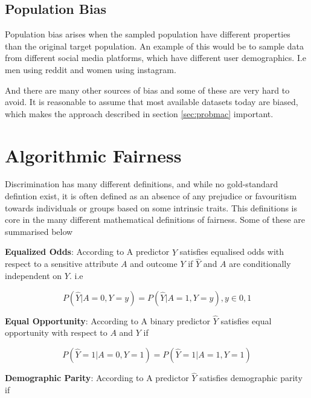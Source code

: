 \subsection{Population Bias}

Population bias arises when the sampled population have different properties than the original target population. \cite{Olteanu:2019:FDATA} An example of this would be to sample data from different social media platforms, which have different user demographics. I.e men using reddit and women using instagram.

And there are many other sources of bias and some of these are very hard to avoid. It is reasonable to assume that most available datasets today are biased, which makes the approach described in section \ref{sec:probmac} important.

\section{Algorithmic Fairness}

Discrimination has many different definitions, and while no gold-standard defintion exist, it is often defined as an absence of any prejudice or favouritism towards individuals or groups based on some intrinsic traits. \cite{Mehrabi:2021:CSUR, Nripsuta:2019:AIES} This definitions is core in the many different mathematical definitions of fairness. Some of these are summarised below

\textbf{Equalized Odds}: According to \citet{Mehrabi:2021:CSUR, Hardt:2016:NIPS} A predictor $\hat{Y}$ satisfies equalised odds with respect to a sensitive attribute $A$ and outcome $Y$ if $\hat{Y}$ and $A$ are conditionally independent on $Y$. i.e

\begin{equation}
    P(\hat{Y}|A=0, Y=y) = P(\hat{Y}|A=1, Y=y), y \in {0, 1}
\end{equation}

\textbf{Equal Opportunity}: According to \citet{Mehrabi:2021:CSUR, Hardt:2016:NIPS} A binary predictor $\hat{Y}$ satisfies equal opportunity with respect to $A$ and $Y$ if

\begin{equation}
    P(\hat{Y}=1|A=0, Y=1) = P(\hat{Y}=1|A=1, Y=1)
\end{equation}

\textbf{Demographic Parity}: According to \citet{Mehrabi:2021:CSUR, Dwork:2012:ITCS} A predictor $\hat{Y}$ satisfies demographic parity if 

